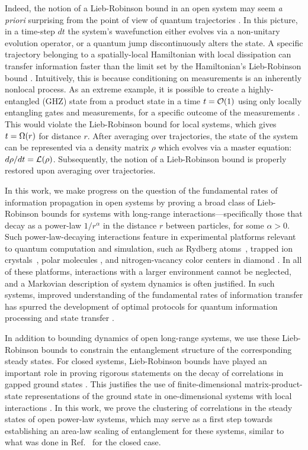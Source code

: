 Indeed, the notion of a  Lieb-Robinson bound in an open system may seem \textit{a priori}  surprising from the point of view of quantum trajectories \cite{Knight1998}. In this picture,  in a time-step $dt$ the system's wavefunction either evolves via a non-unitary evolution operator, or a quantum jump discontinuously  alters the state.
A specific  trajectory belonging to a spatially-local Hamiltonian with local dissipation can transfer information faster than  the limit set by the Hamiltonian's Lieb-Robinson bound \cite{Ashida2018}. Intuitively, this is because conditioning on measurements is an inherently nonlocal process.  As an extreme example, it is possible to create a highly-entangled (GHZ) state from a product state in a time $t = \O{1}$ using only locally entangling gates  and measurements, for a specific outcome of the measurements \cite{Pham2013}.  This would violate the Lieb-Robinson bound for local systems, which gives $t = \W{r}$ for distance $r$. After averaging over trajectories, the state of the system can be represented via a density matrix $\rho$ which evolves via a master equation: $ d \rho / dt =  \mathcal{L} (\rho) $. Subsequently, the notion of a Lieb-Robinson bound is properly restored upon averaging over trajectories.

In this work, we make progress on the question of the fundamental rates of information propagation in open systems by proving a broad class of Lieb-Robinson bounds for systems with long-range interactions---specifically those that decay as a power-law $1/r^\alpha$ in the distance  $r$ between particles, for some $\alpha > 0$.
Such power-law-decaying interactions feature in experimental platforms relevant to quantum computation and simulation, such as Rydberg atoms~\cite{Saffman2010}, trapped ion crystals~\cite{Britton2012,Monroe2021}, polar molecules \cite{Yan2013}, and nitrogen-vacancy color centers in diamond \cite{Yao2012}.
In all of these platforms, interactions with a larger environment cannot be neglected, and a Markovian description of system dynamics is often justified.  In such systems, improved understanding of the fundamental rates of information transfer has spurred the development of optimal protocols for quantum information processing and state transfer \cite{Eldredge2017,Tran2021a}.

In addition to bounding dynamics of open long-range systems, we use these Lieb-Robinson bounds to constrain the entanglement structure of the corresponding steady states.
For closed systems, Lieb-Robinson bounds have played an important role in proving rigorous statements on the decay of correlations in gapped ground states \cite{Hastings2006}. This justifies the use of finite-dimensional matrix-product-state representations of the ground state in one-dimensional systems with local interactions \cite{Hastings2007}.
In this work, we prove the clustering of correlations in the steady states of open power-law systems, which may serve as a first step towards establishing an area-law scaling of entanglement for these systems, similar to what was done in Ref.~\cite{Gong2017} for the closed case.


